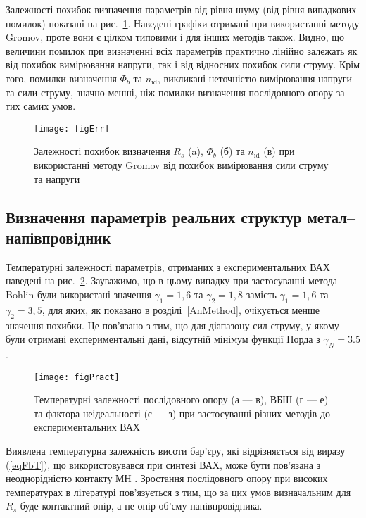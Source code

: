 Залежності похибок визначення параметрів від рівня шуму (від рівня випадкових помилок) показані на рис.~\ref{figErr}.
Наведені графіки отримані при використанні методу Gromov, проте вони є цілком типовими і для інших методів також.
Видно, що величини помилок при визначенні всіх параметрів практично лінійно залежать як від похибок вимірювання напруги, так і від відносних похибок сили струму.
Крім того, помилки визначення $\Phi_b$ та $n_\mathrm{id}$, викликані неточністю вимірювання напруги та сили струму, значно менші, ніж помилки визначення послідовного опору за тих самих умов.


\begin{figure}
\texttt{[image: figErr]}%
\caption{\label{figErr}
Залежності похибок визначення $R_s$ (a), $\Phi_b$ (б) та $n_\mathrm{id}$ (в) при використанні методу Gromov  від похибок вимірювання сили струму та напруги
}
\end{figure}


\subsection{Визначення параметрів реальних структур метал--напівпровідник}

Температурні залежності параметрів, отриманих з експериментальних ВАХ наведені на рис.~\ref{figPract}.
Зауважимо, що в цьому випадку при застосуванні метода Bohlin були використані значення $\gamma_1=1,6$ та $\gamma_2=1,8$ замість  $\gamma_1=1,6$ та $\gamma_2=3,5$, для яких, як показано в розділі~\ref{AnMethod}, очікується менше значення похибки.
Це пов'язано з тим, що для діапазону сил струму, у якому були отримані експериментальні дані, відсутній мінімум функції Норда з $\gamma_N=3.5$.



\begin{figure}
\center
\texttt{[image: figPract]}%
\caption{\label{figPract}
Температурні залежності послідовного опору (а --- в), ВБШ (г --- е) та фактора неідеальності (є --- з) при
застосуванні різних методів до експериментальних ВАХ
}
\end{figure}

Виявлена температурна залежність висоти бар'єру, які відрізняється від виразу (\ref{eqFbT}), що використовувався при синтезі ВАХ, може бути пов'язана з неоднорідністю контакту МН \cite{Tung:MSE,Olikh:2013IEEE}.
Зростання послідовного опору при високих температурах в літературі \cite{Rs:Dokme} пов'язується з тим, що за цих умов визначальним для $R_s$ буде контактний опір, а не опір об'єму напівпровідника.


